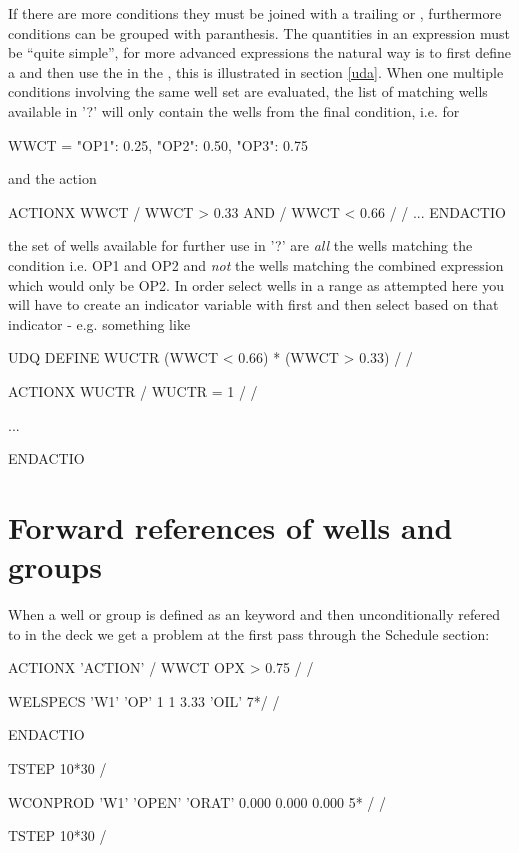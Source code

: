 If there are more conditions they must be joined with a trailing  or
, furthermore conditions can be grouped with paranthesis. The quantities
in an \actionx{} expression must be ``quite simple'', for more advanced
expressions the natural way is to first define a \udq{} and then use the
 in the \actionx{}, this is illustrated in section \ref{uda}. When
one multiple conditions involving the same well set are evaluated, the list of
matching wells available in '?' will only contain the wells from the final
condition, i.e. for
\begin{code}
 WWCT = {"OP1": 0.25, "OP2": 0.50, "OP3": 0.75}
\end{code}
and the action
\begin{deck}
ACTIONX
  WWCT /
  WWCT > 0.33 AND /
  WWCT < 0.66 /
/
...
ENDACTIO
\end{deck}
the set of wells available for further use in '?' are \emph{all} the wells
matching the condition  i.e. OP1 and OP2 and \emph{not}
the wells matching the combined expression  which
would only be OP2. In order select wells in a range as attempted here you will
have to create an indicator variable with \udq{} first and then select based on
that indicator - e.g. something like
\begin{deck}
UDQ
  DEFINE WUCTR (WWCT < 0.66) * (WWCT > 0.33) /
/

ACTIONX
  WUCTR /
  WUCTR = 1 /
/

...

ENDACTIO
\end{deck}



\section{Forward references of wells and groups}
When a well or group is defined as an \actionx{} keyword and then
unconditionally refered to in the deck we get a problem at the first pass
through the Schedule section:

\begin{deck}
ACTIONX
   'ACTION' /
   WWCT OPX  > 0.75 /
/

WELSPECS
  'W1'  'OP'  1 1 3.33  'OIL' 7*/
/

ENDACTIO

TSTEP
  10*30 /

WCONPROD
 'W1'      'OPEN'      'ORAT'      0.000      0.000      0.000  5* /
/

TSTEP
  10*30 /

\end{deck}

